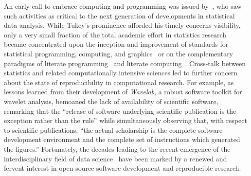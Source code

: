 An early call to embrace computing and programming was issued
by~\citet{tukey1962future}, who saw such activities as critical to the next
generation of developments in statistical data analysis. While Tukey's
prominence afforded his timely concerns visibility, only a very small fraction
of the total academic effort in statistics research became concentrated upon the
inception and improvement of standards for statistical programming, computing,
and graphics~\citep{becker1984s, becker1988new, ihaka1996r} or on the
complementary paradigms of literate programming~\citep{knuth1984literate} and
literate computing~\citep{perez2013literate}. Cross-talk between statistics and
related computationally intensive sciences led to further concern about the
state of reproducibility in computational research. For example, as lessons
learned from their development of \textit{Wavelab}, a robust software toolkit
for wavelet analysis, \citet{buckheit1995wavelab} bemoaned the lack of
availability of scientific software, remarking that the ``release of software
underlying scientific publication is the exception rather than the rule'' while
simultaneously observing that, with respect to scientific publications, ``the
actual scholarship is the complete software development environment and the
complete set of instructions which generated the figures.'' Fortunately, the
decades leading to the recent emergence of the interdisciplinary field of data
science~\citep{donoho2017fifty} have been marked by a renewed and fervent
interest in open source software development and reproducible research.

